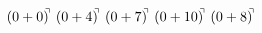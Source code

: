 \documentclass[preview]{standalone}
\begin{document}
\begin{align*}
(0+0)^{\hspace{-0.1cm}\urcorner} \ (0+4)^{\hspace{-0.1cm}\urcorner} \ (0+7)^{\hspace{-0.1cm}\urcorner} \ (0+10)^{\hspace{-0.1cm}\urcorner} \ (0+8)^{\hspace{-0.1cm}\urcorner}
\end{align*}
\end{document}
